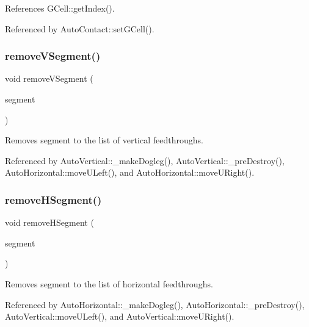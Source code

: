 References G\+Cell\+::get\+Index().



Referenced by Auto\+Contact\+::set\+G\+Cell().

\mbox{\label{classKatabatic_1_1GCell_abe128484d8aa063198292a88c63f2bba}} 
\subsubsection{\texorpdfstring{remove\+V\+Segment()}{removeVSegment()}}
{\footnotesize\ttfamily void remove\+V\+Segment (\begin{DoxyParamCaption}\item[{\hyperlink{classKatabatic_1_1AutoSegment}{Auto\+Segment} $\ast$}]{segment }\end{DoxyParamCaption})}

Removes {\ttfamily segment} to the list of vertical feedthroughs. 

Referenced by Auto\+Vertical\+::\+\_\+make\+Dogleg(), Auto\+Vertical\+::\+\_\+pre\+Destroy(), Auto\+Horizontal\+::move\+U\+Left(), and Auto\+Horizontal\+::move\+U\+Right().

\mbox{\label{classKatabatic_1_1GCell_aff76aa96214c0efcf13186b8b3e5c852}} 
\subsubsection{\texorpdfstring{remove\+H\+Segment()}{removeHSegment()}}
{\footnotesize\ttfamily void remove\+H\+Segment (\begin{DoxyParamCaption}\item[{\hyperlink{classKatabatic_1_1AutoSegment}{Auto\+Segment} $\ast$}]{segment }\end{DoxyParamCaption})}

Removes {\ttfamily segment} to the list of horizontal feedthroughs. 

Referenced by Auto\+Horizontal\+::\+\_\+make\+Dogleg(), Auto\+Horizontal\+::\+\_\+pre\+Destroy(), Auto\+Vertical\+::move\+U\+Left(), and Auto\+Vertical\+::move\+U\+Right().

